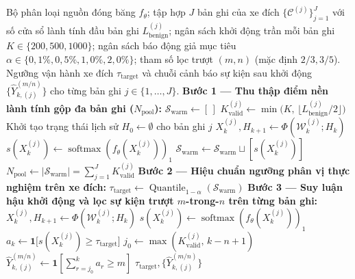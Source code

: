 \documentclass[12pt, a4paper, reqno, oneside]{book}
\begin{document}
\clearpage
\begin{algorithm}[htbp]
\caption{Hiệu chuẩn nền lành tính gộp đa bản ghi ($N_{\text{pool}}$) kết hợp bộ lọc sự kiện trượt $m$-trong-$n$}\label{alg:benign-cal-mofn}
{\small\linespread{1.05}\selectfont
\begin{algorithmic}[1]
\Require Bộ phân loại nguồn đóng băng $f_\theta$; tập hợp $J$ bản ghi của xe đích $\{\mathcal{C}^{(j)}\}_{j=1}^J$ với số cửa sổ lành tính đầu bản ghi $L_{\text{benign}}^{(j)}$; ngân sách khởi động trần mỗi bản ghi $K \in \{200, 500, 1000\}$; ngân sách báo động giả mục tiêu $\alpha \in \{0{,}1\%, 0{,}5\%, 1{,}0\%, 2{,}0\%\}$; tham số lọc trượt $(m, n)$ (mặc định $2/3, 3/5$).
\Ensure Ngưỡng vận hành xe đích $\tau_{\text{target}}$ và chuỗi cảnh báo sự kiện sau khởi động $\{\widehat{Y}_{k, (j)}^{(m/n)}\}$ cho từng bản ghi $j \in \{1, \ldots, J\}$.
\State \textbf{Bước 1 --- Thu thập điểm nền lành tính gộp đa bản ghi ($N_{\text{pool}}$):}
\State $\mathcal{S}_{\text{warm}} \leftarrow [\,]$ 
    \State $K_{\text{valid}}^{(j)} \leftarrow \min\big(K,\, \lfloor L_{\text{benign}}^{(j)} / 2 \rfloor\big)$ 
    \State Khởi tạo trạng thái lịch sử $H_0 \leftarrow \emptyset$ cho bản ghi $j$
        \State $X_k^{(j)}, H_{k+1} \leftarrow \Phi(\mathcal{W}_k^{(j)}; H_k)$ 
        \State $s(X_k^{(j)}) \leftarrow \operatorname{softmax}(f_\theta(X_k^{(j)}))_1$ 
        \State $\mathcal{S}_{\text{warm}} \leftarrow \mathcal{S}_{\text{warm}} \sqcup [s(X_k^{(j)})]$
    \EndFor
\EndFor
\State $N_{\text{pool}} \leftarrow |\mathcal{S}_{\text{warm}}| = \sum_{j=1}^J K_{\text{valid}}^{(j)}$ 
\State \textbf{Bước 2 --- Hiệu chuẩn ngưỡng phân vị thực nghiệm trên xe đích:}
\State $\tau_{\text{target}} \leftarrow \operatorname{Quantile}_{1-\alpha}(\mathcal{S}_{\text{warm}})$ 
\State \textbf{Bước 3 --- Suy luận hậu khởi động và lọc sự kiện trượt $m$-trong-$n$ trên từng bản ghi:}
        \State $X_k^{(j)}, H_{k+1} \leftarrow \Phi(\mathcal{W}_k^{(j)}; H_k)$
        \State $s(X_k^{(j)}) \leftarrow \operatorname{softmax}(f_\theta(X_k^{(j)}))_1$
        \State $a_k \leftarrow \mathbf{1}\big[s(X_k^{(j)}) \ge \tau_{\text{target}}\big]$ 
        \State $j_0 \leftarrow \max(K_{\text{valid}}^{(j)},\, k - n + 1)$
        \State $\widehat{Y}_{k, (j)}^{(m/n)} \leftarrow \mathbf{1}\left[\sum_{r=j_0}^{k} a_r \ge m\right]$ 
    \EndFor
\EndFor
\State \Return $\tau_{\text{target}}, \{\widehat{Y}_{k, (j)}^{(m/n)}\}$
\end{algorithmic}}
\end{algorithm}
\end{document}
